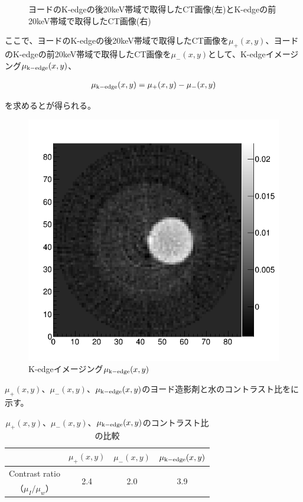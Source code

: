 \begin{figure}[H]
\begin{minipage}{0.5\hsize}
\begin{center}
  \end{center}
 \end{minipage}
 \begin{center}
  \caption{ヨードのK-edgeの後20keV帯域で取得したCT画像(左)とK-edgeの前20keV帯域で取得したCT画像(右)}
  \label{fig:Iodine_kedgeimage}
  \end{center}
\end{figure}

ここで、ヨードのK-edgeの後20keV帯域で取得したCT画像を$\mu_+(x,y)$、ヨードのK-edgeの前20keV帯域で取得したCT画像を$\mu_-(x,y)$として、K-edgeイメージング$\mu_{\rm{k-edge}}(x,y)$、

\begin{align}
\mu_{\rm{k-edge}}(x,y)=\mu_+(x,y)- \mu_-(x,y)
\end{align}

を求めるとが得られる。

\begin{figure}[H]
 \begin{center}
 \includegraphics[bb=0.000000 0.000000 596.000000 574.000000,width=0.6\hsize]{image2/chapter5/image1-image2.png} 
 \end{center}
 \caption{K-edgeイメージング$\mu_{\rm{k-edge}}(x,y)$}
 \label{fig:subtraction}
\end{figure}

$\mu_+(x,y)$、$\mu_-(x,y)$、$\mu_{\rm{k-edge}}(x,y)$のヨード造影剤と水のコントラスト比をに示す。

\begin{table}[htbp]
  \centering
    \begin{tabular}{cccc}
    \toprule
          & $\mu_+(x,y)$ & $\mu_-(x,y)$ & $\mu_{\rm{k-edge}}(x,y)$ \\
    \midrule
    Contrast ratio & \multirow{2}[2]{*}{2.4} & \multirow{2}[2]{*}{2.0} & \multirow{2}[2]{*}{3.9} \\
    （$\mu_I/\mu_w$） &       &       &  \\
    \bottomrule
    \end{tabular}%
     \caption{$\mu_+(x,y)$、$\mu_-(x,y)$、$\mu_{\rm{k-edge}}(x,y)$のコントラスト比の比較}
  \label{tab:subtraction_contrast}%
\end{table}%


